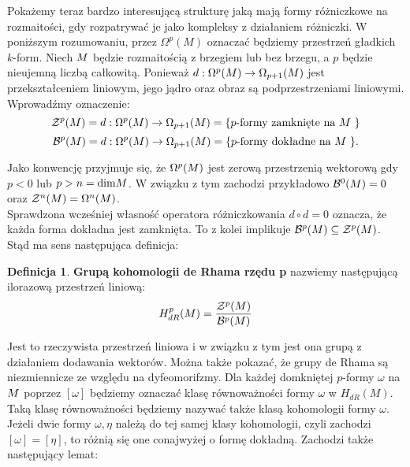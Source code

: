\documentclass[licencjacka]{pracamgr}
\theoremstyle{definition}
\newtheorem{definition}{Definicja}[section]
\theoremstyle{definition}
\theoremstyle{plain}
\theoremstyle{plain}
\theoremstyle{plain}
\theoremstyle{plain}
\def\M{\ensuremath M}
\begin{document}
Pokażemy teraz bardzo interesującą strukturę jaką mają formy różniczkowe
na rozmaitości, gdy rozpatrywać je jako kompleksy z działaniem różniczki.
W poniższym rozumowaniu, przez $\Omega^p (M)$ oznaczać będziemy
przestrzeń gładkich $k$-form.  Niech $\M$ będzie rozmaitością z
brzegiem lub bez brzegu, a $p$ będzie nieujemną liczbą całkowitą.
Ponieważ $d: \Omega^p (\M ) \rightarrow \Omega_{p+1}(\M) $ jest
przekształceniem liniowym, jego jądro oraz obraz są podprzestrzeniami
liniowymi. Wprowadźmy oznaczenie:
\[
\mathcal{Z}^p ( \M ) =
d: \Omega^{p} (\M ) \rightarrow \Omega_{p+1}(\M) =
\{\text{$p$-formy zamknięte na $\M$ } \}
\]
\[
\mathcal{B}^p ( \M ) =
d: \Omega^{p} (\M ) \rightarrow \Omega_{p+1}(\M) =
\{\text{$p$-formy dokładne na $\M$ } \}.
\]

Jako konwencję przyjmuje się, że $\Omega^{p} ( \M ) $ jest zerową
przestrzenią wektorową gdy $p < 0$ lub $p > n = \text{dim} \M $. W
związku z tym zachodzi przykładowo $\mathcal{B}^0(\M)=0$ oraz
$\mathcal{Z}^n(\M)= \Omega^n(\M)$. \\

Sprawdzona wcześniej własność operatora różniczkowania $d \circ d = 0$ oznacza,
że każda forma dokładna jest zamknięta. To z kolei implikuje 
$ \mathcal{B}^p ( \M) \subseteq \mathcal{Z}^p ( \M) $.
Stąd ma sens następująca definicja:

\begin{definition}
  \textbf{Grupą kohomologii de Rhama rzędu p} nazwiemy następującą
  ilorazową przestrzeń liniową:
  \[
  H^{p}_{dR} ( \M ) = \frac {\mathcal{Z}^p ( \M )} {\mathcal{B}^p ( \M )}
  \]
\end{definition}
Jest to rzeczywista przestrzeń liniowa i w związku z tym jest ona
grupą z działaniem dodawania wektorów. Można także pokazać, że grupy de Rhama są
niezmiennicze ze względu na dyfeomorifzmy. Dla każdej domkniętej $p$-formy
$\omega$ na $\M$ poprzez $[\omega]$ będziemy oznaczać klasę równoważności
formy $\omega$ w $H_{dR} (M)$. Taką klasę równoważności będziemy nazywać także klasą
kohomologii formy $\omega$. Jeżeli dwie formy $\omega, \eta$ należą do tej samej klasy
kohomologii, czyli zachodzi $[\omega] = [\eta]$, to różnią się one conajwyżej o formę
dokładną. Zachodzi także następujący lemat:
\end{document}
